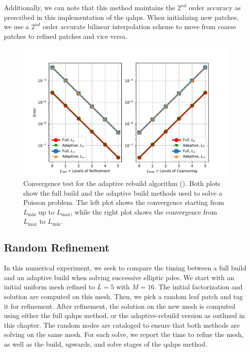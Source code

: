 Additionally, we can note that this method maintains the $2^{nd}$ order accuracy as prescribed in this implementation of the \gls{qahps}. When initializing new patches, we use a $2^{nd}$ order accurate bilinear interpolation scheme to move from coarse patches to refined patches and vice versa.

\begin{figure}
    \centering
    \includegraphics[width=\textwidth, clip=true, trim={20 0 40 40}]{figures/full-vs-adaptive-convergence-no-title.pdf}
    \caption{Convergence test for the adaptive rebuild algorithm (). Both plots show the full build and the adaptive build methods used to solve a Poisson problem. The left plot shows the convergence starting from $L_{\text{min}}$ up to $L_{\text{max}}$, while the right plot shows the convergence from $L_{\text{max}}$ to $L_{\text{min}}$.}
    \label{fig:full-vs-adaptive-convergence}
\end{figure}

\subsection{Random Refinement}
\label{sub:random-refinement}

In this numerical experiment, we seek to compare the timing between a full build and an adaptive build when solving successive elliptic \gls{pdes}. We start with an initial uniform mesh refined to $L = 5$ with $M = 16$. The initial factorization and solution are computed on this mesh. Then, we pick a random leaf patch and tag it for refinement. After refinement, the solution on the new mesh is computed using either the full \gls{qahps} method, or the adaptive-rebuild version as outlined in this chapter. The random nodes are cataloged to ensure that both methods are solving on the same mesh. For each solve, we report the time to refine the mesh, as well as the build, upwards, and solve stages of the \gls{qahps} method.

